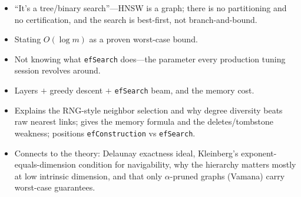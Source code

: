 \begin{interviewq}
\redflags
\begin{itemize}
    \item ``It's a tree/binary search''---HNSW is a graph; there is no partitioning and no certification, and the search is best-first, not branch-and-bound.
    \item Stating $O(\log m)$ as a proven worst-case bound.
    \item Not knowing what \texttt{efSearch} does---the parameter every production tuning session revolves around.
\end{itemize}


\goodgreat
\begin{itemize}
    \item {} Layers $+$ greedy descent $+$ \texttt{efSearch} beam, and the memory cost.
    \item {} Explains the RNG-style neighbor selection and why degree diversity beats raw nearest links; gives the memory formula and the deletes/tombstone weakness; positions \texttt{efConstruction} vs \texttt{efSearch}.
    \item {} Connects to the theory: Delaunay exactness ideal, Kleinberg's exponent-equals-dimension condition for navigability, why the hierarchy matters mostly at low intrinsic dimension, and that only $\alpha$-pruned graphs (Vamana) carry worst-case guarantees.
\end{itemize}

\end{interviewq}


